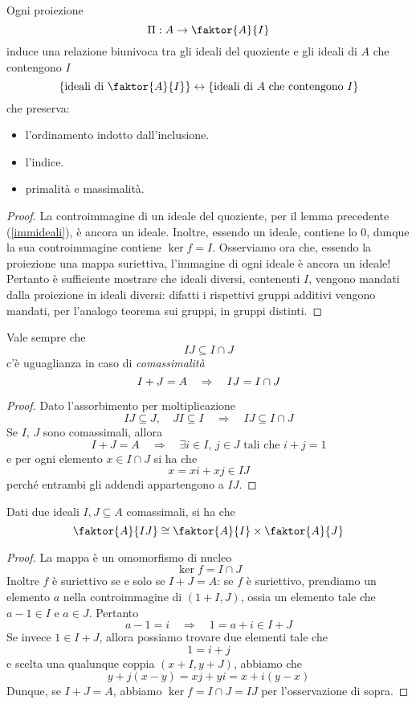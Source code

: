 \begin{multicols}{2}
\begin{theorem}[di corrispondenza]\label{corr}
	Ogni proiezione $$  \Pi : A \to \faktor{A}{I}  $$ induce una relazione biunivoca tra gli ideali del quoziente e gli ideali di $ A $ che contengono $ I $
	\[ \{ \text{ideali di }\faktor{A}{I} \} \leftrightarrow \{ \text{ideali di $ A $ che contengono $ I $} \} \]
	che preserva:
	\begin{itemize}
		\item l'ordinamento indotto dall'inclusione.
		\item l'indice.
		\item primalità e massimalità.
	\end{itemize}
\end{theorem}
\begin{proof}
	La controimmagine di un ideale del quoziente, per il lemma precedente (\ref{immideali}), è ancora un ideale.
	Inoltre, essendo un ideale, contiene lo $ 0 $, dunque la sua controimmagine contiene $ \ker f = I $. Osserviamo ora che, essendo la proiezione una mappa suriettiva, l'immagine di ogni ideale è ancora un ideale! Pertanto è sufficiente mostrare che ideali diversi, contenenti $ I $, vengono mandati dalla proiezione in ideali diversi: difatti i rispettivi gruppi additivi vengono mandati, per l'analogo teorema sui gruppi, in gruppi distinti.
\end{proof}
\begin{remark}
	Vale sempre che
	\[ IJ \subseteq I \cap J \]
	c'è uguaglianza in caso di \emph{comassimalità}
	\[ I + J = A \quad\Rightarrow\quad IJ = I \cap J \]
\end{remark}
\begin{proof}
	Dato l'assorbimento per moltiplicazione
	\[ IJ \subseteq J, \quad JI \subseteq I \quad\Rightarrow\quad IJ \subseteq I \cap J  \]
	Se $ I $, $ J $ sono comassimali, allora
	\[ I + J = A \quad\Rightarrow\quad \exists i \in I, \, j \in J \text{ tali che } i + j = 1 \]
	e per ogni elemento $ x \in I \cap J $ si ha che
	\[ x = xi + xj \in IJ \]
	perché entrambi gli addendi appartengono a $ IJ $.
\end{proof}

\begin{theorem}
	Dati due ideali $ I, J \subseteq A $ comassimali, si ha che
	\[ \faktor{A}{IJ} \cong \faktor{A}{I} \times \faktor{A}{J} \]
\end{theorem}
\begin{proof}
	La mappa
	è un omomorfismo di nucleo
	\[ \ker f = I \cap J \]
	Inoltre $ f $ è suriettivo se e solo se $ I + J = A $: se $ f $ è suriettivo, prendiamo un elemento $ a $ nella controimmagine di $ (1 + I, J) $, ossia un elemento tale che 
	$ a-1 \in I $ e $ a \in J $.
	Pertanto 
	\[ a-1 = i \quad\Rightarrow\quad 1 = a + i \in I + J \]
	Se invece $ 1 \in I + J $, allora possiamo trovare due elementi tale che \[ 1 = i + j \]
	e scelta una qualunque coppia $ (x + I, y + J) $, abbiamo che
	\[ y + j(x-y) = xj + yi = x + i(y-x) \]
	Dunque, se $ I + J = A $, abbiamo $ \ker f = I \cap J = IJ $ per l'osservazione di sopra.
\end{proof}


\end{multicols}

